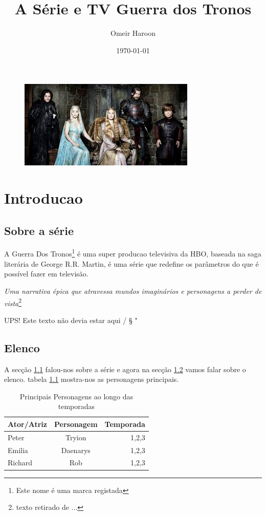 \documentclass[a4paper,8pt,twoside]{report}
\begin{document}
\title{A Série e TV Guerra dos Tronos}

\author{Omeir Haroon}
\date {\today}

\begin{figure}[b]
\center
\includegraphics{got.jpeg}
\end{figure}


\maketitle
\chapter{Introducao}
\section{Sobre a série}\label{sec:intro}
A {\huge Guerra Dos Tronos}\footnote{Este nome é uma marca registada} é uma super producao televisiva da HBO, baseada na saga literária de George R.R. Martin, é uma série que { \footnotesize redefine os parâmetros do que é possível fazer em televisão}.

\vspace{1cm}


\begin{center}
\textit{ Uma narrativa épica que {\LARGE atravessa mundos imaginários} e personagens a perder de vista}\footnote{texto retirado de ... }
\end{center}

\vspace{1cm}

UPS! Este texto não devia estar aqui / § " %

\section{Elenco}\label{sec:lol}
A secção \ref{sec:intro} falou-nos sobre a série e agora na secção \ref{sec:lol} vamos falar sobre o elenco. tabela \ref{sec:intro} mostra-nos as personagens principais.

\begin{table}
	\centering	
	\begin{tabular}{|l|c|r|}
		\hline
		\textbf{Ator/Atriz} & \textbf{Personagem} & \textbf{Temporada}\\
		\hline
		Peter & Tryion & 1,2,3 \\
		\hline
		Emilia & Daenarys & 1,2,3 \\
		\hline
		Richard & Rob & 1,2,3 \\
	\end{tabular}
	\caption{Principais Personagens ao longo das temporadas}
\end{table}
\end{document}
